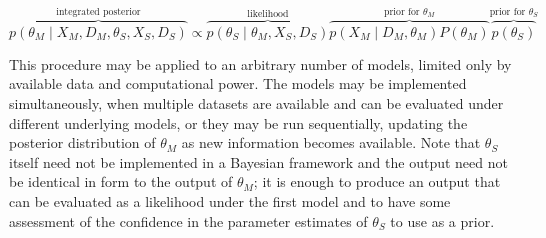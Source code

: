 \documentclass[11pt]{article}
\begin{document}
\begin{equation}
\label{eq:integrated2}
	\overbrace{p( \theta_M \mid X_M, D_M, \theta_S, X_S, D_S )}^\text{integrated posterior}
	\propto 
	\overbrace{p( \theta_S \mid \theta_M, X_S, D_S )}^\text{likelihood}
	\overbrace{p( X_M \mid D_M, \theta_M ) P( \theta_M )}^{\text{prior for } \theta_M}
	\overbrace{p(\theta_S)}^{\text{prior for } \theta_S}
\end{equation}

This procedure may be applied to an arbitrary number of models, limited only by available data and computational power. 
The models may be implemented simultaneously, when multiple datasets are available and can be evaluated under different underlying models, or they may be run sequentially, updating the posterior distribution of $\theta_M$ as new information becomes available. 
Note that $\theta_S$ itself need not be implemented in a Bayesian framework and the output need not be identical in form to the output of \(\theta_M\); it is enough to produce an output that can be evaluated as a likelihood under the first model and to have some assessment of the confidence in the parameter estimates of $\theta_S$ to use as a prior.

\end{document}
